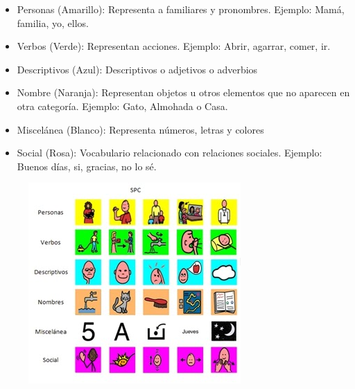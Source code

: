 \begin{itemize}
	\item Personas (Amarillo): Representa a familiares y pronombres. Ejemplo: Mamá, familia,  yo, ellos.
	\item Verbos (Verde): Representan acciones. Ejemplo: Abrir, agarrar, comer, ir.
	\item Descriptivos (Azul): Descriptivos o adjetivos o adverbios
	\item Nombre (Naranja): Representan objetos u otros elementos que no aparecen en otra categoría. Ejemplo: Gato, Almohada o Casa.
	\item Miscelánea (Blanco): Representa números, letras y colores
	\item Social (Rosa): Vocabulario relacionado con relaciones sociales. Ejemplo: Buenos días, si, gracias, no lo sé.
	
\end{itemize}


\begin{figure}[h!]
	\centering
	\includegraphics[width=0.7\linewidth]{Imagenes/Bitmap/SPCcolores}
	\caption{}
	\label{fig:spccolores}
\end{figure}



